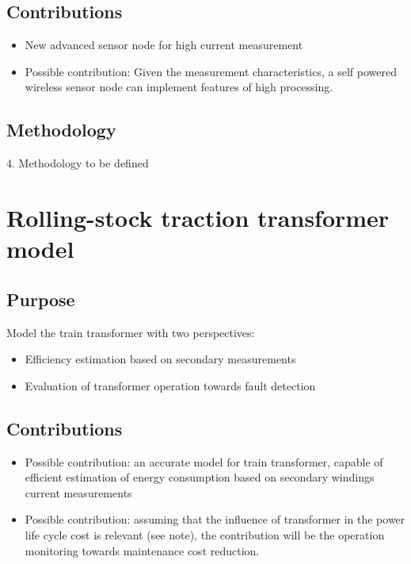 \subsection{Contributions}

\begin{itemize}
	\setlength\itemsep{0em}
	\item New advanced sensor node for high current measurement

	\item Possible contribution: Given the measurement characteristics, a self powered wireless sensor node can implement features of high processing.
\end{itemize}
\subsection{Methodology}

4.	Methodology to be defined





\newpage
\section{Rolling-stock traction transformer model}

\subsection{Purpose}
Model the train transformer with two perspectives:

\begin{itemize}
	\setlength\itemsep{0em}
	\item Efficiency estimation based on secondary measurements
	
	\item Evaluation of transformer operation towards fault detection
\end{itemize}


\subsection{Contributions}

\begin{itemize}
	\setlength\itemsep{0em}
	\item 	Possible contribution: an accurate model for train transformer, capable of efficient estimation of energy consumption based on secondary windings current measurements
	
	\item 	Possible contribution: assuming that the influence of transformer in the power life cycle cost is relevant (see note), the contribution will be the operation monitoring towards maintenance cost reduction.
\end{itemize}


